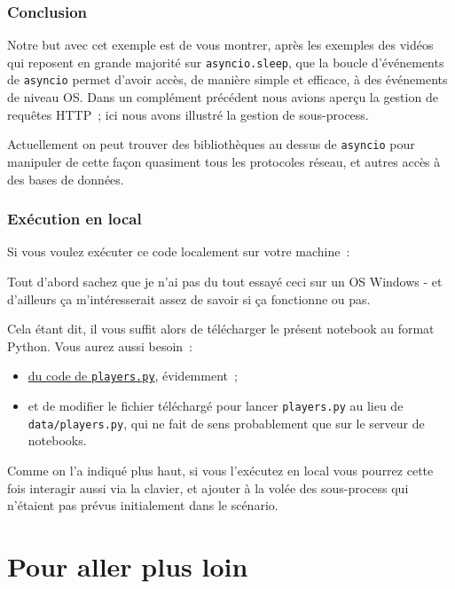     \hypertarget{conclusion}{%
\subsubsection{Conclusion}\label{conclusion}}

    Notre but avec cet exemple est de vous montrer, après les exemples des
vidéos qui reposent en grande majorité sur \texttt{asyncio.sleep}, que
la boucle d'événements de \texttt{asyncio} permet d'avoir accès, de
manière simple et efficace, à des événements de niveau OS. Dans un
complément précédent nous avions aperçu la gestion de requêtes HTTP~;
ici nous avons illustré la gestion de sous-process.

Actuellement on peut trouver des bibliothèques au dessus de
\texttt{asyncio} pour manipuler de cette façon quasiment tous les
protocoles réseau, et autres accès à des bases de données.

    \hypertarget{exuxe9cution-en-local}{%
\subsubsection{Exécution en local}\label{exuxe9cution-en-local}}

    Si vous voulez exécuter ce code localement sur votre machine~:

Tout d'abord sachez que je n'ai pas du tout essayé ceci sur un OS
Windows - et d'ailleurs ça m'intéresserait assez de savoir si ça
fonctionne ou pas.

Cela étant dit, il vous suffit alors de télécharger le présent notebook
au format Python. Vous aurez aussi besoin~:

\begin{itemize}
\tightlist
\item
  \href{data/players.py}{du code de \texttt{players.py}}, évidemment~;
\item
  et de modifier le fichier téléchargé pour lancer \texttt{players.py}
  au lieu de \texttt{data/players.py}, qui ne fait de sens probablement
  que sur le serveur de notebooks.
\end{itemize}

Comme on l'a indiqué plus haut, si vous l'exécutez en local vous pourrez
cette fois interagir aussi via la clavier, et ajouter à la volée des
sous-process qui n'étaient pas prévus initialement dans le scénario.

    \hypertarget{pour-aller-plus-loin}{%
\section{Pour aller plus loin}\label{pour-aller-plus-loin}}


